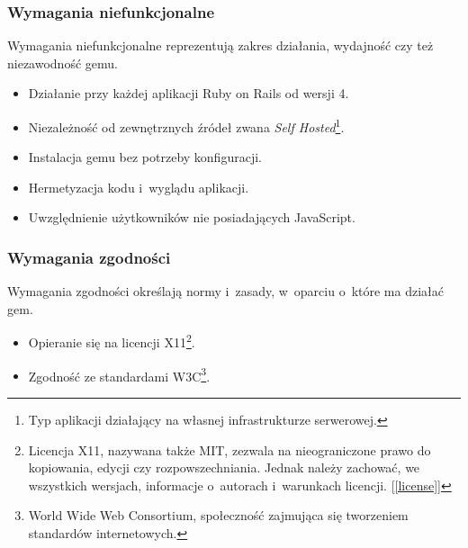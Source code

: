 \begin{itemize}
\end{itemize}

\subsubsection{Wymagania niefunkcjonalne}
Wymagania niefunkcjonalne reprezentują zakres działania, wydajność czy też niezawodność gemu.
\begin{itemize}
  \item Działanie przy każdej aplikacji Ruby on Rails od wersji 4.
  \item Niezależność od zewnętrznych źródeł zwana \emph{Self Hosted}\footnote{Typ aplikacji działający na własnej infrastrukturze serwerowej.}.
  \item Instalacja gemu bez potrzeby konfiguracji.
  \item Hermetyzacja kodu i~wyglądu aplikacji.
  \item Uwzględnienie użytkowników nie posiadających JavaScript.

\end{itemize}

\subsubsection{Wymagania zgodności}
Wymagania zgodności określają normy i~zasady, w~oparciu o~które ma działać gem.
\begin{itemize}
  \item Opieranie się na licencji X11\footnote{Licencja X11, nazywana także MIT, zezwala na nieograniczone prawo do kopiowania, edycji czy rozpowszechniania. Jednak należy zachować, we wszystkich wersjach, informacje o~autorach i~warunkach licencji. [\ref{license}]}.
  \item Zgodność ze standardami W3C\footnote{World Wide Web Consortium, społeczność zajmująca się tworzeniem standardów internetowych.}.
\end{itemize}